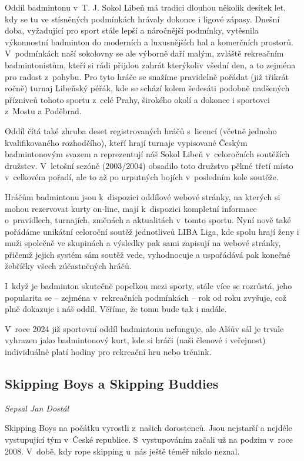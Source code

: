 \documentclass[a5paper, 11pt, twoside]{article}
\begin{document}
Oddíl badmintonu v~T. J. Sokol Libeň má tradici dlouhou několik desítek
let, kdy se tu ve stísněných podmínkách hrávaly dokonce i ligové zápasy.
Dnešní doba, vyžadující pro sport stále lepší a náročnější podmínky,
vytěsnila výkonnostní badminton do moderních a luxusnějších hal a
komerčních prostorů. V~podmínkách naší sokolovny se ale výborně daří
malým, zvláště rekreačním badmintonistům, kteří si rádi přijdou zahrát
kterýkoliv všední den, a to zejména pro radost z~pohybu. Pro tyto hráče
se snažíme pravidelně pořádat (již třikrát ročně) turnaj Libeňský péřák,
kde se schází kolem šedesáti podobně nadšených příznivců tohoto sportu
z~celé Prahy, širokého okolí a dokonce i sportovci z~Mostu a Poděbrad.

Oddíl čítá také zhruba deset registrovaných hráčů s~licencí (včetně
jednoho kvalifikovaného rozhodčího), kteří hrají turnaje vypisované
Českým badmintonovým svazem a reprezentují náš Sokol Libeň v~celoročních
soutěžích družstev. V~letošní sezóně (2003/2004) obsadilo toto družstvo
pěkné třetí místo v~celkovém pořadí, ale to až po urputných bojích
v~posledním kole soutěže.

Hráčům badmintonu jsou k~dispozici oddílové webové stránky, na kterých
si mohou rezervovat kurty on-line, mají k~dispozici kompletní informace
o~pravidlech, turnajích, změnách a aktualitách v~tomto sportu. Nyní nově
také pořádáme unikátní celoroční soutěž jednotlivců LIBA Liga, kde spolu
hrají ženy i muži společně ve skupinách a výsledky pak sami zapisují na
webové stránky, přičemž jejich systém sám soutěž vede, vyhodnocuje a
uspořádává pak konečné žebříčky všech zúčastněných hráčů.

I~když je badminton skutečně popelkou mezi sporty, stále více se
rozrůstá, jeho popularita se -- zejména v~rekreačních podmínkách -- rok
od roku zvyšuje, což plně dokazuje i náš oddíl. Věříme, že tomu bude tak
i nadále.

V~roce 2024 již sportovní oddíl badmintonu nefunguje, ale Alšův sál je
trvale vyhrazen jako badmintonový kurt, kde si hráči (naši členové i
veřejnost) individuálně platí hodiny pro rekreační hru nebo trénink.

\subsection{Skipping Boys a Skipping
Buddies}

\textit{Sepsal Jan Dostál}

Skipping Boys na počátku vyrostli z~našich dorostenců. Jsou nejstarší a
nejdéle vystupující tým v~České republice. S~vystupováním začali už na
podzim v~roce 2008. V~době, kdy rope skipping u~nás ještě téměř nikdo
neznal.
\end{document}
